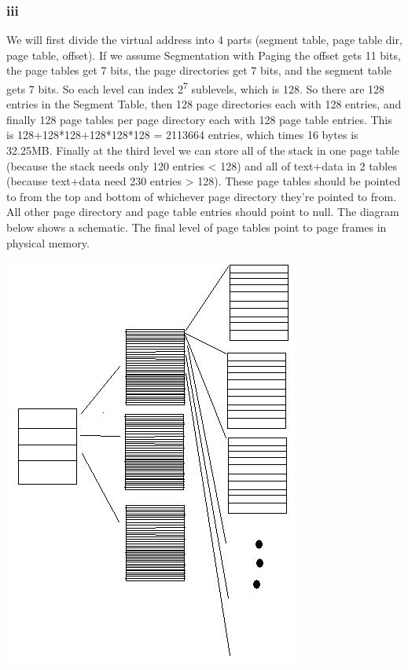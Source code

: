 \documentclass[11pt]{article} %
\begin{document}
\subsubsection*{iii}
We will first divide the virtual address into 4 parts (segment table, page table dir, page table, offset). If we assume Segmentation with Paging the offset gets 11 bits, the page tables get 7 bits, the page directories get 7 bits, and the segment table gets 7 bits. So each level can index 2\textsuperscript{7} sublevels, which is 128. So there are 128 entries in the Segment Table, then 128 page directories each with 128 entries, and finally 128 page tables per page directory each with 128 page table entries. This is 128+128*128+128*128*128 = 2113664 entries, which times 16 bytes is 32.25MB. Finally at the third level we can store all of the stack in one page table (because the stack needs only 120 entries < 128) and all of text+data in 2 tables (because text+data need 230 entries > 128). These page tables should be pointed to from the top and bottom of whichever page directory they're pointed to from. All other page directory and page table entries should point to null. The diagram below shows a schematic. The final level of page tables point to page frames in physical memory.

\includegraphics[scale=2]{Untitled.png}
\end{document}
